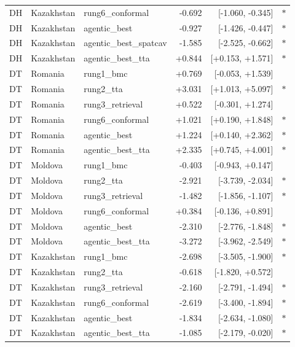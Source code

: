 \begin{table}[t]
\begin{tabular}{l l l r r c}
DH & Kazakhstan & rung6\_conformal & -0.692 & [-1.060, -0.345] & $\ast$ \\
DH & Kazakhstan & agentic\_best & -0.927 & [-1.426, -0.447] & $\ast$ \\
DH & Kazakhstan & agentic\_best\_spatcav & -1.585 & [-2.525, -0.662] & $\ast$ \\
DH & Kazakhstan & agentic\_best\_tta & +0.844 & [+0.153, +1.571] & $\ast$ \\
\midrule
DT & Romania & rung1\_bmc & +0.769 & [-0.053, +1.539] &  \\
DT & Romania & rung2\_tta & +3.031 & [+1.013, +5.097] & $\ast$ \\
DT & Romania & rung3\_retrieval & +0.522 & [-0.301, +1.274] &  \\
DT & Romania & rung6\_conformal & +1.021 & [+0.190, +1.848] & $\ast$ \\
DT & Romania & agentic\_best & +1.224 & [+0.140, +2.362] & $\ast$ \\
DT & Romania & agentic\_best\_tta & +2.335 & [+0.745, +4.001] & $\ast$ \\
DT & Moldova & rung1\_bmc & -0.403 & [-0.943, +0.147] &  \\
DT & Moldova & rung2\_tta & -2.921 & [-3.739, -2.034] & $\ast$ \\
DT & Moldova & rung3\_retrieval & -1.482 & [-1.856, -1.107] & $\ast$ \\
DT & Moldova & rung6\_conformal & +0.384 & [-0.136, +0.891] &  \\
DT & Moldova & agentic\_best & -2.310 & [-2.776, -1.848] & $\ast$ \\
DT & Moldova & agentic\_best\_tta & -3.272 & [-3.962, -2.549] & $\ast$ \\
DT & Kazakhstan & rung1\_bmc & -2.698 & [-3.505, -1.900] & $\ast$ \\
DT & Kazakhstan & rung2\_tta & -0.618 & [-1.820, +0.572] &  \\
DT & Kazakhstan & rung3\_retrieval & -2.160 & [-2.791, -1.494] & $\ast$ \\
DT & Kazakhstan & rung6\_conformal & -2.619 & [-3.400, -1.894] & $\ast$ \\
DT & Kazakhstan & agentic\_best & -1.834 & [-2.634, -1.080] & $\ast$ \\
DT & Kazakhstan & agentic\_best\_tta & -1.085 & [-2.179, -0.020] & $\ast$ \\
\midrule
\bottomrule
\end{tabular}
\end{table}